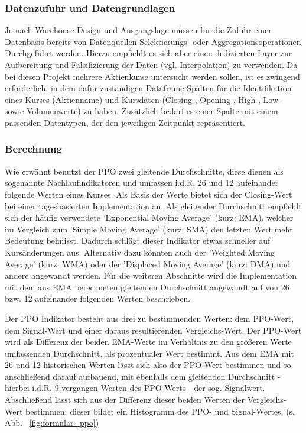 \subsubsection{Datenzufuhr und Datengrundlagen} 
\label{subsec_datenbase_ppo}
Je nach Warehouse-Design und Ausgangslage müssen für die Zufuhr einer Datenbasis bereits von Datenquellen Selektierungs- oder Aggregationsoperationen Durchgeführt werden. Hierzu empfiehlt es sich aber einen dedizierten Layer zur Aufbereitung und Falsifizierung der Daten (vgl. Interpolation) zu verwenden. 
Da bei diesen Projekt mehrere Aktienkurse untersucht werden sollen, ist es zwingend erforderlich, in dem dafür zuständigen Dataframe Spalten für die Identifikation eines Kurses (Aktienname) und Kursdaten (Closing-, Opening-,  High-, Low- sowie Volumenwerte) zu haben. Zusätzlich bedarf es einer Spalte mit einem passenden Datentypen, der den jeweiligen Zeitpunkt repräsentiert.

\subsubsection{Berechnung}
\label{subsec_berrechnung_ppo}
Wie erwähnt benutzt der PPO zwei gleitende Durchschnitte, diese dienen als sogenannte Nachlaufindikatoren und umfassen i.d.R. 26 und 12 aufeinander folgende Werten eines Kurses. Als Basis der Werte bietet sich der Closing-Wert bei einer tagesbasierten Implementation an. Als gleitender Durchschnitt empfiehlt sich der häufig verwendete 'Exponential Moving Average' (kurz: EMA), welcher im Vergleich zum 'Simple Moving Average' (kurz: SMA) den letzten Wert mehr Bedeutung beimisst. Dadurch schlägt dieser Indikator etwas schneller auf Kursänderungen aus. Alternativ dazu könnten auch der 'Weighted Moving Average' (kurz: WMA) oder der 'Displaced Moving Average' (kurz: DMA) und andere angewandt werden. Für die weiteren Abschnitte wird die Implementation mit dem aus EMA berechneten gleitenden Durchschnitt angewandt auf von 26 bzw. 12 aufeinander folgenden Werten beschrieben. 

Der PPO Indikator besteht aus drei zu bestimmenden Werten: dem PPO-Wert, dem Signal-Wert und einer daraus resultierenden Vergleichs-Wert. Der PPO-Wert wird als Differenz der beiden EMA-Werte im Verhältnis zu den größeren Werte umfassenden Durchschnitt, als prozentualer Wert bestimmt. Aus dem EMA mit 26 und 12 historischen Werten lässt sich also der PPO-Wert bestimmen und so anschließend darauf aufbauend, mit ebenfalls dem gleitenden Durchschnitt - hierbei i.d.R. 9 vergangen Werten des PPO-Werts - der sog. Signalwert. Abschließend lässt sich aus der Differenz dieser beiden Werten der Vergleichs-Wert bestimmen; dieser bildet ein Histogramm des PPO- und Signal-Wertes. (s. Abb. ~\ref{fig:formular_ppo})


